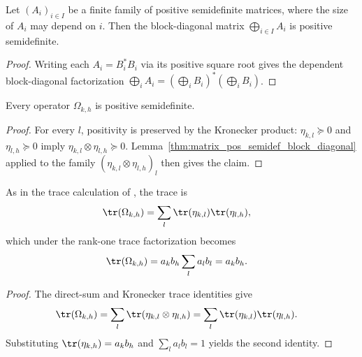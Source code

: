 \begin{lemma}
    \label{thm:matrix_pos_semidef_block_diagonal}
    \leanok
    Let $(A_i)_{i\in I}$ be a finite family of positive semidefinite matrices,
    where the size of $A_i$ may depend on $i$. Then the block-diagonal matrix
    $\bigoplus_{i\in I}A_i$ is positive semidefinite.
\end{lemma}
\begin{proof}
    \leanok
    Writing each $A_i=B_i^*B_i$ via its positive square root gives the
    dependent block-diagonal factorization
    $\bigoplus_i A_i=(\bigoplus_i B_i)^*(\bigoplus_i B_i)$.
\end{proof}

\begin{lemma}
    \label{thm:mpdo_eta_omega_pos}
    \leanok
    Every operator $\Omega_{k,h}$ is positive semidefinite.
\end{lemma}
\begin{proof}
    \leanok
    For every $l$, positivity is preserved by the Kronecker product:
    $\eta_{k,l}\succeq 0$ and $\eta_{l,h}\succeq 0$ imply
    $\eta_{k,l}\otimes\eta_{l,h}\succeq 0$.
    Lemma~\ref{thm:matrix_pos_semidef_block_diagonal} applied to the family
    $(\eta_{k,l}\otimes\eta_{l,h})_l$ then gives the claim.
\end{proof}

\begin{lemma}
    \label{thm:mpdo_eta_omega_trace}
    \leanok
    As in the trace calculation of
    \cite[Appendix~C.2, lines~1531--1535]{Cirac2016MPDO_arXiv}, the trace is
    \begin{align}
        \tr(\Omega_{k,h})
         & =\sum_l\tr(\eta_{k,l})\tr(\eta_{l,h}), \notag
    \end{align}
    which under the rank-one trace factorization becomes
    \begin{align}
        \tr(\Omega_{k,h})
         & =a_kb_h\sum_l a_lb_l=a_kb_h. \notag
    \end{align}
\end{lemma}
\begin{proof}
    \leanok
    The direct-sum and Kronecker trace identities give
    \begin{align}
        \tr(\Omega_{k,h})
         & =\sum_l\tr(\eta_{k,l}\otimes\eta_{l,h})
        =\sum_l\tr(\eta_{k,l})\tr(\eta_{l,h}). \notag
    \end{align}
    Substituting
    $\tr(\eta_{k,h})=a_kb_h$ and $\sum_l a_lb_l=1$ yields the second identity.
\end{proof}

